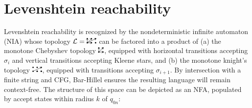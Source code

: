 \documentclass[sigplan,review,anonymous,acmsmall]{acmart}\settopmatter{printfolios=false,printccs=false,printacmref=false}
\begin{document}
%
%

\section{Levenshtein reachability}

Levenshtein reachability is recognized by the nondeterministic infinite automaton (NIA) whose topology $\mathcal{L} = \knightkingarrow$ can be factored into a product of (a) the monotone Chebyshev topology $\kingarrow$, equipped with horizontal transitions accepting $\sigma_{i}$ and vertical transitions accepting Kleene stars, and (b) the monotone knight's topology $\knightarrow$, equipped with transitions accepting $\sigma_{i+1}$. By intersection with a finite string and CFG, Bar-Hillel ensures the resulting language will remain context-free. The structure of this space can be depicted as an NFA, populated by accept states within radius $k$ of $q_{0n}$:
\end{document}

